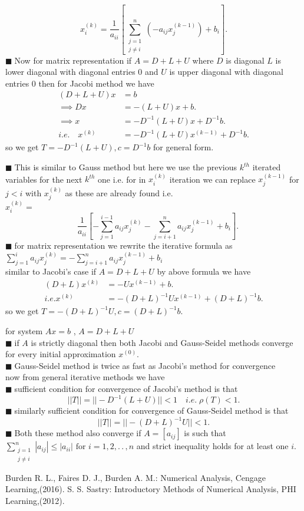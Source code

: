 \documentclass[11pt]{extarticle}
\newcommand{\ck}{.\,.\,}
\newcommand{\sm}[2]{\displaystyle\sum_{#1}^{#2}}
\newcommand{\tbx}[2][]{
\begin{tcolorbox}[enhanced,breakable,size=small,colback=black!2!white,title={#1},arc is angular, arc=1.5mm,drop fuzzy shadow]
	#2
\end{tcolorbox}
}
\newcommand{\y}{$\blacksquare\;$}
\begin{document}
\begin{multicols}{2}
{				\[ x_i^{(k)}=\frac{ 1 }{a_{ii}} \left[\sm{\substack{j=1 \\ j\neq i}}{n}(-a_{ij}x_j^{(k-1)}) +b_i\right].\]
				 \y Now for matrix representation if $ A=D+L+U $ where $ D $ is diagonal $ L $ is lower diagonal with diagonal entries $ 0 $ and $ U $ is upper diagonal with diagonal entries $ 0 $ then for Jacobi method we have 
				 \begin{align*}
				 	(D+L+U)x&=b\\
				 	\implies Dx&= -(L+U)x+b.\\
				 	\implies x&=-D^{-1}(L+U)x+D^{-1}b.\\
				 	i.e. \quad x^{(k)}&=-D^{-1}(L+U)x^{(k-1)}+D^{-1}b.
				 	\end{align*}  
			 	so we get $ T=-D^{-1}(L+U),c=D^{-1}b $ for general form.}
				 \tbx[Gauss-Seidel Method]{ \y This is similar to Gauss method but here we use the previous $ k^{th} $ iterated variables for the next $ k^{th} $ one  i.e. for in $ x_i^{(k)} $ iteration we can replace $ x_j^{(k-1)} $ for $ j<i $ with $ x_j^{(k)} $ as these are already found i.e.\\
				 	 $x_i^{(k)}=$
				 \[\quad \frac{ 1 }{a_{ii}} \left[-\sm{j=1}{i-1}a_{ij}x_j^{(k)}-\sm{j=i+1}{n}a_{ij}x_j^{(k-1)}+b_i\right].\] 
				 \y for matrix representation we rewrite the iterative formula as \\
				 $\sm{j=1}{i}a_{ij}x_j^{(k)}=-\sm{j=i+1}{n}a_{ij}x_j^{(k-1)}+b_i$\\
				 similar to Jacobi's case if $ A=D+L+U $ by above formula we have 
				{ \small
					\begin{align*}
				 	(D+L)x^{(k)}&=-Ux^{(k-1)}+b.\\
				 	i.e. x^{(k)}&= -(D+L)^{-1}Ux^{(k-1)}+(D+L)^{-1}b.
				 	\end{align*}}
			 	so we get $ T=-(D+L)^{-1}U,c=(D+L)^{-1}b. $ }
			 	\tbx{ for system $ Ax=b $ , $ A=D+L+U $ \\
			 		\y if $  A$ is strictly diagonal then both Jacobi and Gauss-Seidel methods converge for every initial approximation $ x^{(0)}. $ \\
			 		\y  Gauss-Seidel method is twice as fast as Jacobi's method for convergence \\
			 		now from general iterative methods we have \\
			 		\y sufficient condition for convergence of Jacobi's method is that 
			 		\[||T||=||-D^{-1}(L+U)||<1\quad i.e.\; \rho(T)<1.\]
			 		\y similarly  sufficient condition for convergence of Gauss-Seidel method is that 
			 		\[ ||T||=||-(D+L)^{-1}U||<1.\]
			 		\y Both these method also converge if $ A =[a_{ij}]$ is such that \\
			 		 $ \sm{\substack{j=1\\ j\neq i}}{n}|a_{ij}|\leq |a_{ii}| \text{ for } i=1,2,\ck,n $ and strict inequality holds for at least one $ i $.   }
			 		 
			 		 
\begin{thebibliography}{9}
	Burden R. L., Faires D. J., Burden A. M.: Numerical Analysis, Cengage Learning,(2016).
	S. S. Sastry: Introductory Methods of Numerical Analysis, PHI Learning,(2012).
\end{thebibliography}			 		 
			 		 
	\end{multicols}
\end{document}
